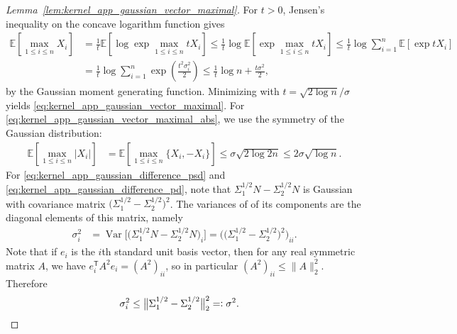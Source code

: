 \documentclass[11pt,lof]{puthesis}
\newcommand{\E}{\ensuremath{\mathbb{E}}}
\newcommand{\T}{\ensuremath{\mathsf{T}}}
\DeclareMathOperator{\Var}{Var}
\theoremstyle{break}
\theoremstyle{proof}
\newtheorem{proof}{Proof}
\begin{document}
\begin{proof}[Lemma~\ref{lem:kernel_app_gaussian_vector_maximal}]

  For $t > 0$,
  Jensen's inequality on the concave logarithm function
  gives
  \begin{align*}
    \E\left[
      \max_{1 \leq i \leq n}
      X_i
    \right]
    &=
    \frac{1}{t}
    \E\left[
      \log
      \exp
      \max_{1 \leq i \leq n}
      t X_i
    \right]
    \leq
    \frac{1}{t}
    \log
    \E\left[
      \exp
      \max_{1 \leq i \leq n}
      t X_i
    \right]
    \leq
    \frac{1}{t}
    \log
    \sum_{i=1}^n
    \E\left[
      \exp
      t X_i
    \right] \\
    &=
    \frac{1}{t}
    \log
    \sum_{i=1}^n
    \exp
    \left(
      \frac{t^2 \sigma_i^2}{2}
    \right)
    \leq
    \frac{1}{t}
    \log n
    + \frac{t \sigma^2}{2},
  \end{align*}
  by the Gaussian moment generating function.
  Minimizing with $t = \sqrt{2 \log n} / \sigma$
  yields \eqref{eq:kernel_app_gaussian_vector_maximal}.
  For \eqref{eq:kernel_app_gaussian_vector_maximal_abs},
  we use the symmetry of the Gaussian distribution:
  \begin{align*}
    \E\left[
      \max_{1 \leq i \leq n}
      |X_i|
    \right]
    &=
    \E\left[
      \max_{1 \leq i \leq n}
      \{X_i, -X_i\}
    \right]
    \leq
    \sigma \sqrt{2 \log 2n}
    \leq
    2 \sigma \sqrt{\log n}.
  \end{align*}
  For \eqref{eq:kernel_app_gaussian_difference_psd}
  and \eqref{eq:kernel_app_gaussian_difference_pd},
  note that
  $\Sigma_1^{1/2} N - \Sigma_2^{1/2} N$
  is Gaussian with covariance matrix
  $\big(\Sigma_1^{1/2} - \Sigma_2^{1/2}\big)^2$.
  The variances of of its components are the diagonal
  elements of this matrix, namely
  \begin{align*}
    \sigma_i^2
    &=
    \Var\big[
      \big(\Sigma_1^{1/2} N - \Sigma_2^{1/2} N\big)_i
    \big]
    =
    \Big(\big(
        \Sigma_1^{1/2} - \Sigma_2^{1/2}
    \big)^2\Big)_{ii}.
  \end{align*}
  Note that if $e_i$ is the
  $i$th standard unit basis vector,
  then for any real symmetric matrix $A$,
  we have
  $e_i^\T A^2 e_i = (A^2)_{ii}$,
  so in particular
  $(A^2)_{ii} \leq \|A\|_2^2$.
  Therefore
  \begin{align*}
    \sigma_i^2
    &\leq
    \big\|
    \Sigma_1^{1/2} - \Sigma_2^{1/2}
    \big\|_2^2
    =\vcentcolon
    \sigma^2.
  \end{align*}

\end{proof}
\end{document}
